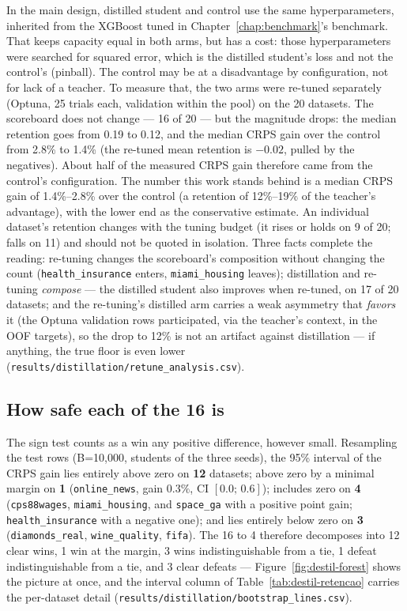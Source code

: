 In the main design, distilled student and control use the same
hyperparameters, inherited from the XGBoost tuned in
Chapter~\ref{chap:benchmark}'s benchmark. That keeps capacity equal
in both arms, but has a cost: those hyperparameters were searched
for squared error, which is the distilled student's loss and not the
control's (pinball). The control may be at a disadvantage by
configuration, not for lack of a teacher. To measure that, the two
arms were re-tuned separately (Optuna, 25 trials each, validation
within the pool) on the 20 datasets. The scoreboard does not change
--- 16 of 20 --- but the magnitude drops: the median retention goes
from 0.19 to 0.12, and the median CRPS gain over the control from
2.8\% to 1.4\% (the re-tuned mean retention is $-0.02$, pulled by
the negatives). About half of the measured CRPS gain therefore came
from the control's configuration. The number this work stands behind
is a median CRPS gain of 1.4\%--2.8\% over the control (a retention
of 12\%--19\% of the teacher's advantage), with the lower end as the
conservative estimate. An individual dataset's
retention changes with the tuning budget (it rises or holds on 9 of
20; falls on 11) and should not be quoted in isolation. Three facts
complete the reading: re-tuning changes the scoreboard's composition
without changing the count (\texttt{health\_\allowbreak insurance}
enters, \texttt{miami\_\allowbreak housing} leaves); distillation
and re-tuning \emph{compose} --- the distilled student also improves
when re-tuned, on 17 of 20 datasets; and the re-tuning's distilled
arm carries a weak asymmetry that \emph{favors} it (the Optuna
validation rows participated, via the teacher's context, in the OOF
targets), so the drop to 12\% is not an artifact against
distillation --- if anything, the true floor is even lower
(\texttt{results/\allowbreak distillation/\allowbreak retune\_\allowbreak analysis.csv}).

\subsection{How safe each of the 16 is}
\label{sec:destil-bootstrap}

The sign test counts as a win any positive difference, however
small. Resampling the test rows (B=10{,}000, students of the three
seeds), the 95\% interval of the CRPS gain lies entirely above zero
on \textbf{12} datasets; above zero by a minimal margin on
\textbf{1} (\texttt{online\_news}, gain $0.3\%$, CI $[0.0;\,0.6]$);
includes zero on \textbf{4} (\texttt{cps88wages},
\texttt{miami\_\allowbreak housing}, and \texttt{space\_ga} with a
positive point gain; \texttt{health\_\allowbreak insurance} with a
negative one); and lies entirely below zero on \textbf{3}
(\texttt{diamonds\_\allowbreak real},
\texttt{wine\_\allowbreak quality}, \texttt{fifa}). The 16 to 4
therefore decomposes into 12 clear wins, 1 win at the margin, 3 wins
indistinguishable from a tie, 1 defeat indistinguishable from a tie,
and 3 clear defeats --- Figure~\ref{fig:destil-forest} shows the
picture at once, and the interval column of
Table~\ref{tab:destil-retencao} carries the per-dataset detail
(\texttt{results/\allowbreak distillation/\allowbreak bootstrap\_\allowbreak lines.csv}).

